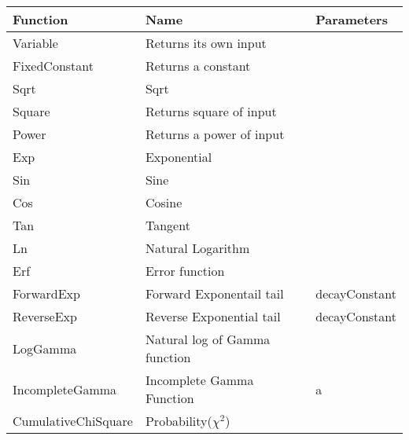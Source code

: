 \documentclass{report}
\begin{document}
\begin{table*}
\begin{center}
\begin{tabular}{|l|l|l|}
\hline
Function                       & Name                              & Parameters              \\ \hline
Variable                       & Returns its own input             &                         \\ \hline
FixedConstant                  & Returns a constant                &                         \\ \hline
Sqrt                           & Sqrt                              &                         \\ \hline
Square                         & Returns square of input           &                         \\ \hline
Power                          & Returns a power of input          &                         \\ \hline
Exp                            & Exponential                       &                         \\ \hline
Sin                            & Sine                              &                         \\ \hline
Cos                            & Cosine                            &                         \\ \hline
Tan                            & Tangent                           &                         \\ \hline
Ln                             & Natural Logarithm                 &                         \\ \hline
Erf                            & Error function                    &                         \\ \hline
ForwardExp                     & Forward Exponentail tail          & decayConstant           \\ \hline
ReverseExp                     & Reverse Exponential tail          & decayConstant           \\ \hline
LogGamma                       & Natural log of Gamma function     &                         \\ \hline
IncompleteGamma                & Incomplete Gamma Function         & a                       \\ \hline
CumulativeChiSquare            & Probability($\chi^2$)              &                         \\ \hline                          

\end{tabular}
\end{center}
\end{table*}
\end{document}
